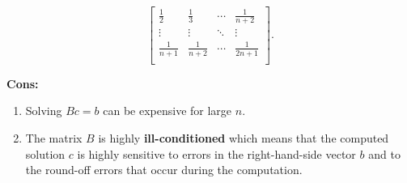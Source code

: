 \documentclass{report}
\begin{document}
\begin{itemize}
\begin{enumerate}
$$\begin{bmatrix}
                        \frac{1}{2} & \frac13 & \cdots & \frac{1}{n+2} \\
                        \vdots & \vdots & \ddots & \vdots \\
                        \frac{1}{n+1} & \frac{1}{n+2} & \cdots & \frac{1}{2n + 1}\\
                    \end{bmatrix}.
                    $$
            \end{enumerate}
            \textbf{Cons:}
            \begin{enumerate}
                \item Solving $B c = b$ can be expensive for large $n$.
                \item The matrix $B$ is highly \textbf{ill-conditioned} which means that the computed solution $c$ is highly sensitive to errors in the right-hand-side vector $b$ and to the round-off errors that occur during the computation.
            \end{enumerate}


\end{itemize}
\end{document}
